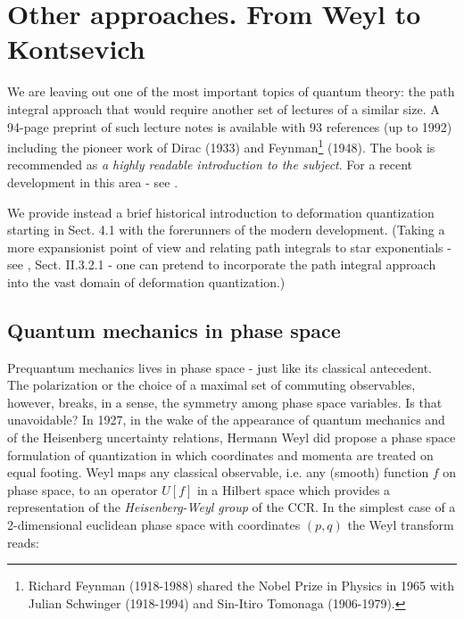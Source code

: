 \bigskip

\section{Other approaches. From Weyl to Kontsevich}
\setcounter{equation}{0}
\renewcommand\theequation{\thesection.\arabic{equation}}

We are leaving out one of the most important topics of quantum theory: the path integral approach that would require another set
of lectures of a similar size. A 94-page preprint of such lecture notes is available \cite{Gr} with 93 references (up to 1992)
including the pioneer work of Dirac (1933) and Feynman\footnote{Richard Feynman (1918-1988) shared the Nobel Prize in Physics in 1965
with Julian Schwinger (1918-1994) and Sin-Itiro Tomonaga (1906-1979).} (1948). The book \cite{ZJ} is recommended as {\it a highly 
readable introduction to the subject}. For a recent development in this area - see \cite{W10}. 

We provide instead a brief historical introduction to deformation quantization starting in Sect. 4.1 with the forerunners of the
modern development. (Taking a more expansionist point of view and relating path integrals to star exponentials - see \cite{S98},
Sect. II.3.2.1 - one can pretend to incorporate the path integral approach into the vast domain of deformation quantization.)

\smallskip

\subsection{Quantum mechanics in phase space}

Prequantum mechanics lives in phase space - just like its classical antecedent. The polarization or the choice of a maximal set
of commuting observables, however, breaks, in a sense, the symmetry among phase space variables. Is that unavoidable? In 1927, in
the wake of the appearance of quantum mechanics and of the Heisenberg uncertainty relations, Hermann Weyl \cite{We} did propose 
a phase space formulation of quantization in which coordinates and momenta are treated on equal footing. Weyl maps any classical 
observable, i.e. any (smooth) function $f$ on phase space, to an operator $U[f]$ in a Hilbert 
space which provides a representation of the {\it Heisenberg-Weyl group} of the CCR. In the simplest case of a 2-dimensional
euclidean phase space with coordinates $(p, q)$ the Weyl transform reads:


